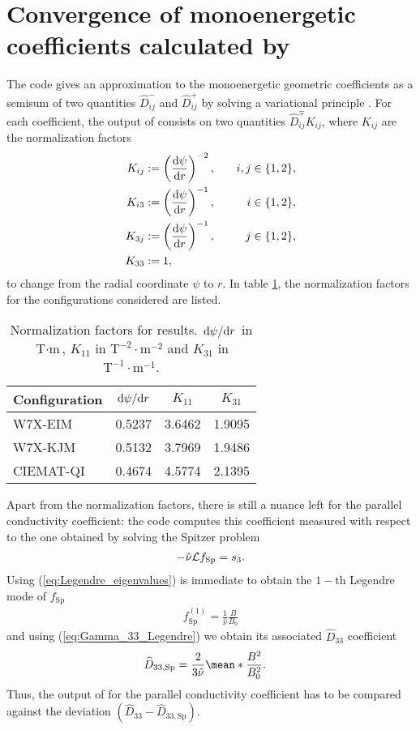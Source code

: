 \section{Convergence of monoenergetic coefficients calculated by {\DKES}}\label{sec:Appendix_DKES_Bounds}

\FloatBarrier
The code {\DKES} gives an approximation to the monoenergetic geometric coefficients as a semisum of two quantities $\widehat{D}_{ij}^- $ and $\widehat{D}_{ij}^+$ by solving a variational principle \cite{VanRij_1989}. For each coefficient, the output of {\DKES} consists on two quantities $\widehat{D}_{ij}^\mp K_{ij}$, where $K_{ij}$ are the normalization factors
%
\begin{align}
	K_{ij} & :=\left(\dv{\psi}{r}\right)^{-2}, &\quad i,j \in\{1,2\},
	\\
	K_{i3} & :=  \left(\dv{\psi}{r} \right)^{-1}, &\quad i \in\{1,2\},
	\\
	K_{3j} & := \left(\dv{\psi}{r} \right)^{-1}, &\quad j \in\{1,2\},
	\\
	K_{33} & := 1, &
\end{align} 
to change from the radial coordinate $\psi$ to $r$. In table \ref{tab:DKES_normalization_factors}, the normalization factors for the configurations considered are listed. 
%
\begin{table}[h]
	\centering
	\begin{tabular}{@{}lccc@{}}
		\toprule
		Configuration & $\dv*{\psi}{r}$ & $K_{11}$    & $K_{31}$    
		\\ \midrule
		W7X-EIM       & 0.5237  & 3.6462 & 1.9095 \\
		W7X-KJM       & 0.5132  & 3.7969 & 1.9486 \\
		CIEMAT-QI     & 0.4674  & 4.5774 & 2.1395 \\ \bottomrule
	\end{tabular}
	\caption{Normalization factors for {\DKES} results. $\dv*{\psi}{r}$ in $\text{T}\cdot\text{m}$, $K_{11}$ in $\text{T}^{-2}\cdot\text{m}^{-2}$ and $K_{31}$ in $\text{T}^{-1}\cdot\text{m}^{-1}$.}
	\label{tab:DKES_normalization_factors}
\end{table}

Apart from the normalization factors, there is still a nuance left for the parallel conductivity coefficient: the code {\DKES} computes this coefficient measured with respect to the one obtained by solving the Spitzer problem
%
\begin{align}
	-\hat{\nu} \mathcal{L} f_{\text{Sp}} = s_3.
\end{align}
Using (\ref{eq:Legendre_eigenvalues}) is immediate to obtain the $1-$th Legendre mode of $f_{\text{Sp}}$
%
\begin{align}
	f_{\text{Sp}}^{(1)} =  \frac{1}{\hat{\nu}} \frac{B}{B_0}
\end{align}
and using (\ref{eq:Gamma_33_Legendre}) we obtain its associated $\widehat{D}_{33}$ coefficient
\begin{align}
	\widehat{D}_{33,\text{Sp}} & = \frac{2}{3\hat{\nu}} \mean*{\frac{B^2}{B_0^2}}.
\end{align}
Thus, the output of {\DKES} for the parallel conductivity coefficient has to be compared against the deviation $(\widehat{D}_{33} - \widehat{D}_{33,\text{Sp}})$. 

